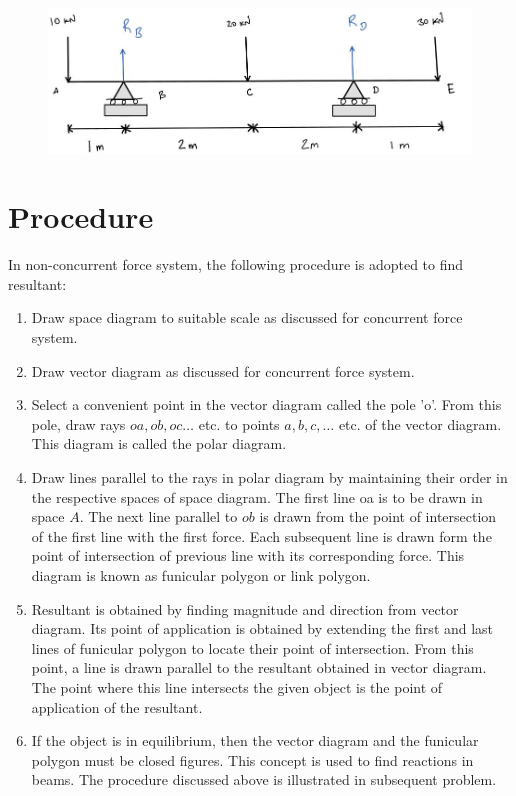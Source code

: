 \documentclass[11pt]{article}
\begin{document}
\begin{figure}[H]
	\centering
	\includegraphics[scale=0.3]{ncfc.jpg}
	\label{fig: Polygon Law}
\end{figure}

\section{Procedure}
In non-concurrent force system, the following procedure is adopted to find resultant: 
\begin{enumerate}
	\item Draw space diagram to suitable scale as discussed for concurrent force system.
	\item Draw vector diagram as discussed for concurrent force system.
	\item Select a convenient point in the vector diagram called the pole 'o'. From this pole, draw rays $o a, o b, o c \ldots$ etc. to points $a, b, c, \ldots$ etc. of the vector diagram. This diagram is called the polar diagram.
	\item Draw lines parallel to the rays in polar diagram by maintaining their order in the respective spaces of space diagram. The first line oa is to be drawn in space $A$. The next line parallel to $o b$ is drawn from the point of intersection of the first line with the first force. Each subsequent line is drawn form the point of intersection of previous line with its corresponding force. This diagram is known as funicular polygon or link polygon.
	\item Resultant is obtained by finding magnitude and direction from vector diagram. Its point of application is obtained by extending the first and last lines of funicular polygon to locate their point of intersection. From this point, a line is drawn parallel to the resultant obtained in vector diagram. The point where this line intersects the given object is the point of application of the resultant.
	\item If the object is in equilibrium, then the vector diagram and the funicular polygon must be closed figures. This concept is used to find reactions in beams. The procedure discussed above is illustrated in subsequent problem.
\end{enumerate}
\end{document}

